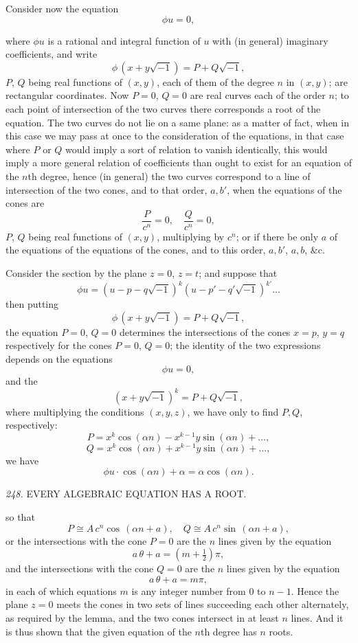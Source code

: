 \documentclass[11pt,a4paper]{book}
\begin{document}
Consider now the equation
\[
\phi u = 0,
\]

\setcounter{page}{118}

where $\phi u$ is a rational and integral function of $u$ with (in general) imaginary coefficients, and write
\[
\phi\,(x+y\sqrt{-1}) = P + Q\sqrt{-1},
\]
$P$, $Q$ being real functions of $(x, y)$, each of them of the degree $n$ in $(x, y)$; are rectangular coordinates. Now $P=0$, $Q=0$ are real curves each of the order $n$; to each point of intersection of the two curves there corresponds a root of the equation. The two curves do not lie on a same plane: as a matter of fact, when in this case we may pass at once to the consideration of the equations, in that case where $P$ or $Q$ would imply a sort of relation to vanish identically, this would imply a more general relation of coefficients than ought to exist for an equation of the $n$th degree, hence (in general) the two curves correspond to a line of intersection of the two cones, and to that order, $a, b'$, when the equations of the cones are
\[
\frac{P}{c^n}=0,\quad \frac{Q}{c^n}=0,
\]
$P$, $Q$ being real functions of $(x, y)$, multiplying by $c^n$; or if there be only $a$ of the equations of the equations of the cones, and to this order, $a, b'$, $a, b$, $\&$c.

Consider the section by the plane $z=0$, $z=t$; and suppose that
\[
\phi u = (u - p - q\sqrt{-1})^k (u - p' - q'\sqrt{-1})^{k'} \ldots
\]
then putting
\[
\phi\,(x+y\sqrt{-1}) = P + Q\sqrt{-1},
\]
the equation $P=0$, $Q=0$ determines the intersections of the cones $x=p$, $y=q$ respectively for the cones $P=0$, $Q=0$; the identity of the two expressions depends on the equations
\[
\phi u = 0,
\]
and the
\[
(x+y\sqrt{-1})^k = P + Q\sqrt{-1},
\]
where multiplying the conditions $(x, y, z)$, we have only to find $P, Q$, respectively:
\[
P = x^k\cos(\alpha n) - x^{k-1}y\sin(\alpha n) + \ldots,
\]
\[
Q = x^k\cos(\alpha n) + x^{k-1}y\sin(\alpha n) + \ldots,
\]
we have
\[
\phi u \cdot \cos(\alpha n) + \alpha = \alpha \cos(\alpha n).
\]

\setcounter{page}{119}

\noindent\textit{248.} \quad EVERY ALGEBRAIC EQUATION HAS A ROOT.

so that
\[
P\cong A\,c^n\cos\,(\alpha n + a),\quad Q\cong A\,c^n\sin\,(\alpha n + a),
\]
or the intersections with the cone $P=0$ are the $n$ lines given by the equation
\[
a\,\theta + a = (m + \tfrac{1}{2})\pi,
\]
and the intersections with the cone $Q=0$ are the $n$ lines given by the equation
\[
a\,\theta + a = m\pi,
\]
in each of which equations $m$ is any integer number from 0 to $n-1$. Hence the plane $z = 0$ meets the cones in two sets of lines succeeding each other alternately, as required by the lemma, and the two cones intersect in at least $n$ lines. And it is thus shown that the given equation of the $n$th degree has $n$ roots.
\end{document}
